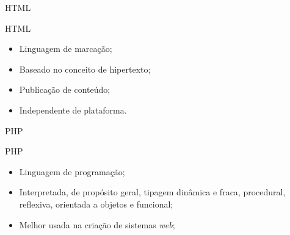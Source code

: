 \begin{frame}{HTML}
	\begin{block}{HTML}
	\begin{itemize}
		\item Linguagem de marcação;
		\item Baseado no conceito de hipertexto;
		\item Publicação de conteúdo;
		\item Independente de plataforma.
	\end{itemize}
\end{block}
\end{frame}

\begin{frame}{PHP}
	\begin{block}{PHP}
	\begin{itemize}
		\item Linguagem de programação;
		\item Interpretada, de propósito geral, tipagem dinâmica e 
	fraca, procedural, reflexiva, orientada a objetos e funcional;
		\item Melhor usada na criação de sistemas \textit{web};
	\end{itemize}
	\end{block}
\end{frame}